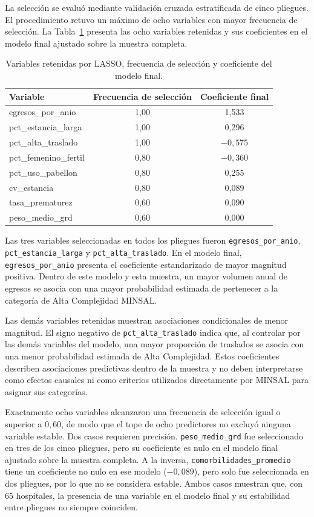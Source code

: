 La selección se evaluó mediante validación cruzada estratificada de cinco
pliegues. El procedimiento retuvo un máximo de ocho variables con mayor
frecuencia de selección. La Tabla~\ref{tab:lasso-frecuencia} presenta las ocho
variables retenidas y sus coeficientes en el modelo final ajustado sobre la
muestra completa.

\begin{table}[htbp]
\centering
\caption{Variables retenidas por LASSO, frecuencia de selección y coeficiente del modelo final.}
\label{tab:lasso-frecuencia}
\begin{tabular}{l c c}
\toprule
\textbf{Variable} & \textbf{Frecuencia de selección} &
\textbf{Coeficiente final} \\
\midrule
egresos\_por\_anio & 1,00 & 1,533 \\
pct\_estancia\_larga & 1,00 & 0,296 \\
pct\_alta\_traslado & 1,00 & $-0{,}575$ \\
pct\_femenino\_fertil & 0,80 & $-0{,}360$ \\
pct\_uso\_pabellon & 0,80 & 0,255 \\
cv\_estancia & 0,80 & 0,089 \\
tasa\_prematurez & 0,60 & 0,090 \\
peso\_medio\_grd & 0,60 & 0,000 \\
\bottomrule
\end{tabular}
\end{table}

Las tres variables seleccionadas en todos los pliegues fueron
\texttt{egresos\_por\_anio}, \texttt{pct\_estancia\_larga} y
\texttt{pct\_alta\_traslado}. En el modelo final, \texttt{egresos\_por\_anio}
presenta el coeficiente estandarizado de mayor magnitud positiva. Dentro de este
modelo y esta muestra, un mayor volumen anual de egresos se asocia con una mayor
probabilidad estimada de pertenecer a la categoría de Alta Complejidad MINSAL.

Las demás variables retenidas muestran asociaciones condicionales de menor
magnitud. El signo negativo de \texttt{pct\_alta\_traslado} indica que, al
controlar por las demás variables del modelo, una mayor proporción de traslados
se asocia con una menor probabilidad estimada de Alta Complejidad. Estos
coeficientes describen asociaciones predictivas dentro de la muestra y no deben
interpretarse como efectos causales ni como criterios utilizados directamente
por MINSAL para asignar sus categorías.

Exactamente ocho variables alcanzaron una frecuencia de selección igual o
superior a $0{,}60$, de modo que el tope de ocho predictores no excluyó ninguna
variable estable. Dos casos requieren precisión. \texttt{peso\_medio\_grd} fue
seleccionado en tres de los cinco pliegues, pero su coeficiente es nulo en el
modelo final ajustado sobre la muestra completa. A la inversa,
\texttt{comorbilidades\_promedio} tiene un coeficiente no nulo en ese modelo
($-0{,}089$), pero solo fue seleccionada en dos pliegues, por lo que no se
considera estable. Ambos casos muestran que, con 65 hospitales, la presencia de
una variable en el modelo final y su estabilidad entre pliegues no siempre
coinciden.

